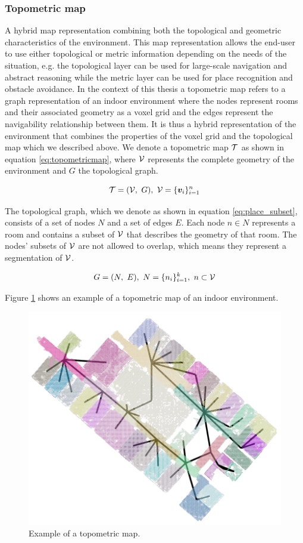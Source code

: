 \subsubsection{Topometric map}
A hybrid map representation combining both the topological and geometric characteristics of the environment. This map representation allows the end-user to use either topological or metric information depending on the needs of the situation, e.g. the topological layer can be used for large-scale navigation and abstract reasoning while the metric layer can be used for place recognition and obstacle avoidance. In the context of this thesis a topometric map refers to a graph representation of an indoor environment where the nodes represent rooms and their associated geometry as a voxel grid and the edges represent the navigability relationship between them. It is thus a hybrid representation of the environment that combines the properties of the voxel grid and the topological map which we described above. We denote a topometric map \(\mathcal{T}\) as shown in equation \ref{eq:topometricmap}, where \(\mathcal{V}\) represents the complete geometry of the environment and \(G\) the topological graph.

\begin{equation}
    \label{eq:topometricmap}
    \topometricmap = (\voxelgrid,\ G),\ \voxelgrid=\{\voxel_{i}\}_{i=1}^{n}
\end{equation}

The topological graph, which we denote as shown in equation \ref{eq:place_subset}, consists of a set of nodes \(N\) and a set of edges \(E\). Each node \(n \in N\) represents a room and contains a subset of \(\mathcal{V}\) that describes the geometry of that room. The nodes' subsets of \(\mathcal{V}\) are not allowed to overlap, which means they represent a segmentation of \(\mathcal{V}\).

\begin{equation}
    \label{eq:place_subset}
    G=(N,\ E),\ N=\{n_i\}_{i=1}^k,\ n \subset \mathcal{V}
\end{equation}

Figure \ref{fig:topometricmap} shows an example of a topometric map of an indoor environment.

\begin{figure}[h]
    \centering
    \includegraphics*[width=.7\textwidth]{./fig/area_1_topo_01.png}
    \caption{Example of a topometric map.}
    \label{fig:topometricmap}
\end{figure}


